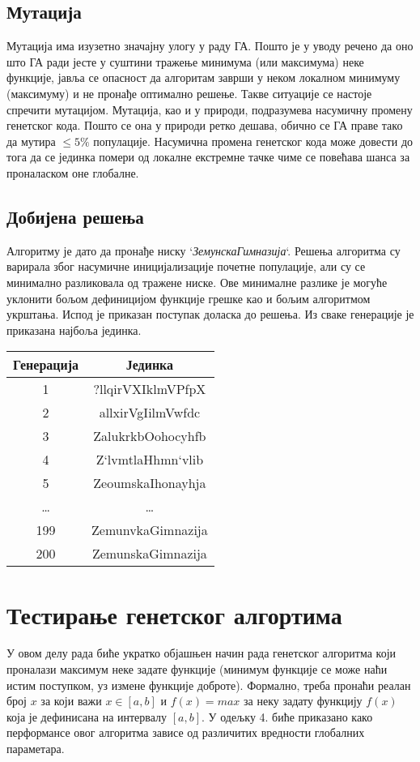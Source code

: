 \documentclass{article}
\begin{document}
\subsection{Мутација}
Мутација има изузетно значајну улогу у раду ГА. Пошто је у уводу речено
да оно што ГА ради јесте у суштини тражење минимума (или максимума) неке функције, јавља се 
опасност да алгоритам заврши у неком локалном минимуму (максимуму) и не пронађе 
оптимално решење. Такве ситуације се настоје спречити мутацијом. Мутација, као и у природи,
подразумева насумичну промену генетског кода. Пошто се она у природи ретко дешава, обично
се ГА праве тако да мутира $\leq 5 \%$ популације. Насумична промена генетског кода 
може довести до тога да се јединка помери од локалне екстремне тачке чиме се повећава 
шанса за проналаском оне глобалне.

\subsection{Добијена решења}
Алгоритму је дато да пронађе ниску `\textit{ЗемунскаГимназија}`. Решења алгоритма су варирала
због насумичне иницијализације почетне популације, али су се минимално разликовала од тражене ниске.
Ове минималне разлике је могуће уклонити бољом дефиницијом функције грешке као и бољим алгоритмом укрштања.
Испод је приказан поступак доласка до решења. Из сваке генерације је приказана најбоља јединка.

\begin{table}[H]
    \centering
    \begin{tabular}{|c|c|}
        \textbf{Генерација} & \textbf{Јединка} \\ 
        \hline
        1 & ?llqirVXIklmVPfpX  \\
        2 & allxirVgIilmVwfdc  \\
        3 & ZalukrkbOohocyhfb  \\
        4 & Z`lvmtlaHhmn`vlib  \\
        5 & ZeoumskaIhonayhja  \\
        \dots & \dots \\
        199 & ZemunvkaGimnazija \\
        200 & ZemunskaGimnazija \\
    \end{tabular}
\end{table}

\section{Тестирање генетског алгортима}
У овом делу рада биће укратко објашњен начин рада генетског алгоритма који проналази
максимум неке задате функције (минимум функције се може наћи истим поступком, уз 
измене функције доброте). Формално, треба пронаћи реалан број $x$ за који важи $x \in [a, b]$ и 
$f(x) = max$ за неку задату функцију $f(x)$ која је дефинисана на интервалу $[a, b]$. 
У одељку 4. биће приказано како перформансе овог алгоритма зависе од различитих 
вредности глобалних параметара.
\end{document}
